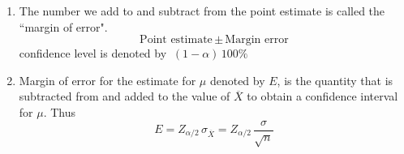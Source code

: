 \documentclass[11pt,a4paper]{article}
\theoremstyle{definition}
\begin{document}
\begin{enumerate}
\item[$\bullet$] The number we add to and subtract from the point estimate is called the ``margin of error".
\[\text{Point estimate}\, \pm \, \text{Margin error}\]
confidence level is denoted by $\ (1-\alpha)\, 100\%$
\item[$\bullet$] Margin of error for the estimate for $\mu$ denoted by $E$, is the quantity that is subtracted from and added to the value of $\overline{X}$ to obtain a confidence interval for $\mu$. Thus \[E = Z_{\alpha/2}\,\sigma_{\overline{X}} = Z_{\alpha/2}\,\frac{\sigma}{\sqrt{n}}\]\\
\end{enumerate}
\end{document}

